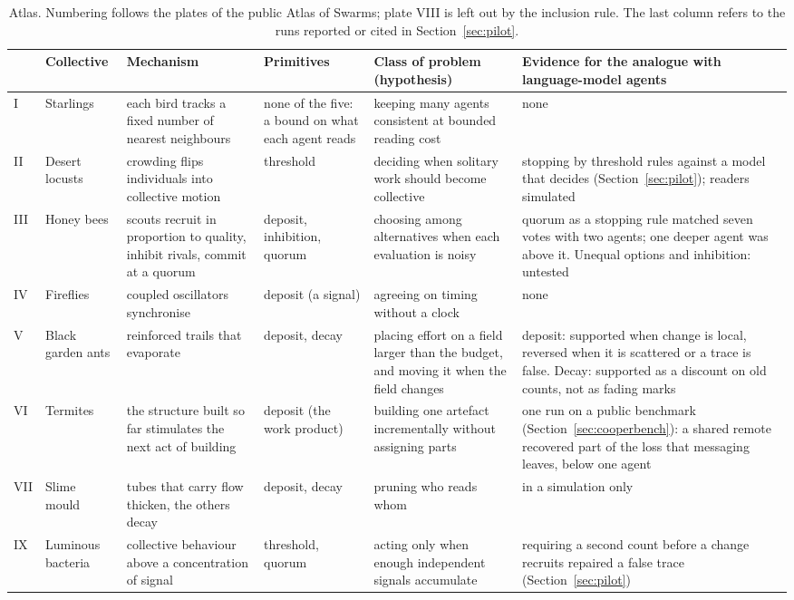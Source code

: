 \documentclass[10pt,twocolumn]{article}
\begin{document}
\begin{table}[t]
\centering\small
\begin{tabularx}{\textwidth}{@{}l >{\raggedright\arraybackslash}p{1.75cm} >{\raggedright\arraybackslash}p{3.3cm} >{\raggedright\arraybackslash}p{1.9cm} Y >{\raggedright\arraybackslash}p{4.1cm}@{}}
\toprule
 & Collective & Mechanism & Primitives & Class of problem (hypothesis) & Evidence for the analogue with language-model agents \\
\midrule
I & Starlings & each bird tracks a fixed number of nearest neighbours~\cite{ballerini2008} & none of the five: a bound on what each agent reads & keeping many agents consistent at bounded reading cost & none \\
II & Desert locusts & crowding flips individuals into collective motion & threshold & deciding when solitary work should become collective & stopping by threshold rules against a model that decides (Section~\ref{sec:pilot}); readers simulated \\
III & Honey bees & scouts recruit in proportion to quality, inhibit rivals, commit at a quorum~\cite{seeley2003,seeley2012} & deposit, inhibition, quorum & choosing among alternatives when each evaluation is noisy & quorum as a stopping rule matched seven votes with two agents; one deeper agent was above it. Unequal options and inhibition: untested \\
IV & Fireflies & coupled oscillators synchronise & deposit (a signal) & agreeing on timing without a clock & none \\
V & Black garden ants & reinforced trails that evaporate~\cite{goss1989,dorigo1996} & deposit, decay & placing effort on a field larger than the budget, and moving it when the field changes & deposit: supported when change is local, reversed when it is scattered or a trace is false. Decay: supported as a discount on old counts, not as fading marks \\
VI & Termites & the structure built so far stimulates the next act of building~\cite{grasse1959} & deposit (the work product) & building one artefact incrementally without assigning parts & one run on a public benchmark (Section~\ref{sec:cooperbench}): a shared remote recovered part of the loss that messaging leaves, below one agent \\
VII & Slime mould & tubes that carry flow thicken, the others decay~\cite{tero2010} & deposit, decay & pruning who reads whom & in a simulation only \\
IX & Luminous bacteria & collective behaviour above a concentration of signal~\cite{miller2001} & threshold, quorum & acting only when enough independent signals accumulate & requiring a second count before a change recruits repaired a false trace (Section~\ref{sec:pilot}) \\
\bottomrule
\end{tabularx}
\caption{Atlas. Numbering follows the plates of the public Atlas of Swarms; plate VIII is left out by the inclusion rule. The last column refers to the runs reported or cited in Section~\ref{sec:pilot}.}
\label{tab:atlas}
\end{table}
\end{document}
